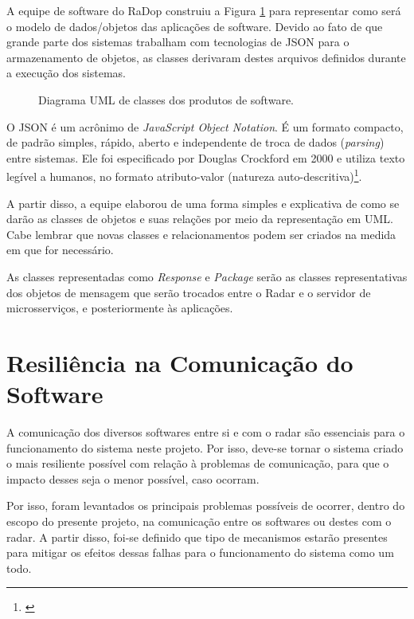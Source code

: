 A equipe de software do RaDop construiu a Figura \ref{fig:diagrama-classe-soft} para representar como será o modelo de dados/objetos das aplicações de software. Devido ao fato de que grande parte dos sistemas trabalham com tecnologias de JSON para o armazenamento de objetos, as classes derivaram destes arquivos definidos durante a execução dos sistemas.

\begin{figure}[h]
	\caption{\label{fig:diagrama-classe-soft} Diagrama UML de classes dos produtos de software.}
\end{figure}


O JSON é um acrônimo de \textit{JavaScript Object Notation}. É um formato compacto, de padrão simples, rápido, aberto e independente de troca de dados (\textit{parsing}) entre sistemas. Ele foi especificado por Douglas Crockford em 2000 e utiliza texto legível a humanos, no formato atributo-valor (natureza auto-descritiva)\footnote{\cite{jsonorg}}.

A partir disso, a equipe elaborou de uma forma simples e explicativa de como se darão as classes de objetos e suas relações por meio da representação em UML. Cabe lembrar que novas classes e relacionamentos podem ser criados na medida em que for necessário.

As classes representadas como \textit{Response} e \textit{Package} serão as classes representativas dos objetos de mensagem que serão trocados entre o Radar e o servidor de microsserviços, e posteriormente às aplicações.

\section{Resiliência na Comunicação do Software}

A comunicação dos diversos softwares entre si e com o radar são essenciais para o funcionamento do sistema neste projeto. Por isso, deve-se tornar o sistema criado o mais resiliente possível com relação à problemas de comunicação, para que o impacto desses seja o menor possível, caso ocorram.

Por isso, foram levantados os principais problemas possíveis de ocorrer, dentro do escopo do presente projeto, na comunicação entre os softwares ou destes com o radar. A partir disso, foi-se definido que tipo de mecanismos estarão presentes para mitigar os efeitos dessas falhas para o funcionamento do sistema como um todo.

